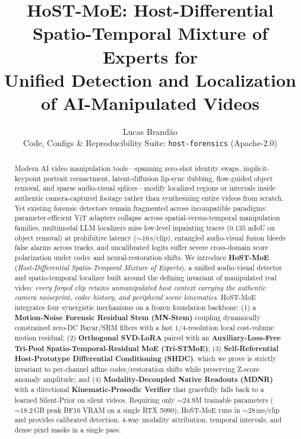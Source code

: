 \documentclass[10pt,twocolumn]{article}
\title{\Large\textbf{HoST-MoE: Host-Differential Spatio-Temporal Mixture of Experts for\\Unified Detection and Localization of AI-Manipulated Videos}}
\author{
  Lucas Brand\~{a}o\\
  {\small Code, Configs \& Reproducibility Suite: \texttt{host-forensics} (Apache-2.0)}
}
\date{}
\begin{document}
\maketitle

\begin{abstract}
Modern AI video manipulation tools---spanning zero-shot identity swaps, implicit-keypoint portrait reenactment, latent-diffusion lip-sync dubbing, flow-guided object removal, and sparse audio-visual splices---modify localized regions or intervals inside authentic camera-captured footage rather than synthesizing entire videos from scratch. Yet existing forensic detectors remain fragmented across incompatible paradigms: parameter-efficient ViT adapters collapse across spatial-versus-temporal manipulation families, multimodal LLM localizers miss low-level inpainting traces ($0.135$ mIoU on object removal) at prohibitive latency (${\sim}16$\,s/clip), entangled audio-visual fusion bleeds false alarms across tracks, and uncalibrated logits suffer severe cross-domain score polarization under codec and neural-restoration shifts. We introduce \textbf{HoST-MoE} (\emph{Host-Differential Spatio-Temporal Mixture of Experts}), a unified audio-visual detector and spatio-temporal localizer built around the defining invariant of manipulated real video: \emph{every forged clip retains unmanipulated host context carrying the authentic camera noiseprint, codec history, and peripheral scene kinematics}. HoST-MoE integrates four synergistic mechanisms on a frozen foundation backbone: (1) a \textbf{Motion-Noise Forensic Residual Stem (MN-Stem)} coupling dynamically constrained zero-DC Bayar/SRM filters with a fast $1/4$-resolution local cost-volume motion residual; (2) \textbf{Orthogonal SVD-LoRA} paired with an \textbf{Auxiliary-Loss-Free Tri-Pool Spatio-Temporal-Residual MoE (Tri-STMoE)}; (3) \textbf{Self-Referential Host-Prototype Differential Conditioning (SHDC)}, which we prove is strictly invariant to per-channel affine codec/restoration shifts while preserving Z-score anomaly amplitude; and (4) \textbf{Modality-Decoupled Native Readouts (MDNR)} with a directional \textbf{Kinematic-Prosodic Verifier} that gracefully falls back to a learned Silent-Prior on silent videos. Requiring only ${\sim}24.9$M trainable parameters (${\sim}18.2$\,GB peak BF16 VRAM on a single RTX 5090), HoST-MoE runs in ${\sim}28$\,ms/clip and provides calibrated detection, 4-way modality attribution, temporal intervals, and dense pixel masks in a single pass.
\end{abstract}
\end{document}
